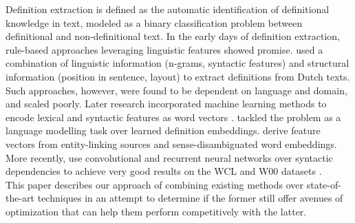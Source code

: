 \documentclass[11pt]{article}
\begin{document}
Definition extraction is defined as the automatic identification of definitional knowledge in text, modeled as a binary
classification problem between definitional and non-definitional text. In the early days of definition extraction,
rule-based approaches leveraging linguistic features showed promise.  used a combination of
linguistic information (n-grams, syntactic features) and structural information (position in sentence, layout) to extract
definitions from Dutch texts. Such approaches, however, were found to be dependent on language and domain, and scaled poorly.
Later research incorporated machine learning methods to encode lexical and syntactic features as word vectors
\cite{del2014coping}.  tackled the problem as a language modelling task over learned definition
embeddings.  derive feature vectors from entity-linking sources and sense-disambiguated word
embeddings. More recently,  use convolutional and recurrent neural networks over syntactic dependencies to achieve very good results on the WCL and W00 datasets \cite{navigli2010learning,jin2013mining}.\\

This paper describes our approach of combining existing methods over state-of-the-art techniques in an attempt to determine if
the former still offer avenues of optimization that can help them perform competitively with the latter.
\end{document}
